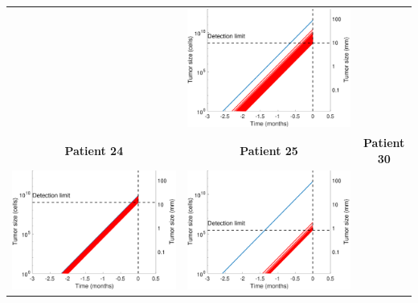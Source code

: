 \begin{tabular}{ccc}
&
\includegraphics[width=\coll]{simulations/patient_16/growth_mets.pdf}
\\[2ex]
\textbf{Patient 24}
&
\textbf{Patient 25}
&
\textbf{Patient 30}
\\[1ex]
\includegraphics[width=\coll]{simulations/patient_24/growth_mets.pdf}
&
\includegraphics[width=\coll]{simulations/patient_25/growth_mets.pdf}

\end{tabular}
